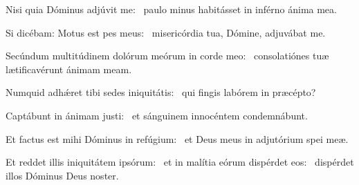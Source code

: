 \item Nisi quia Dóminus adjúvit me:~\psstar{} paulo minus habitásset in inférno ánima mea.

\item Si dicébam: Motus est pes meus:~\psstar{} misericórdia tua, Dómine, adjuvábat me.

\item Secúndum multitúdinem dolórum meórum in corde meo:~\psstar{} consolatiónes tuæ lætificavérunt ánimam meam.

\item Numquid adhǽret tibi sedes iniquitátis:~\psstar{} qui fingis labórem in præcépto?

\item Captábunt in ánimam justi:~\psstar{} et sánguinem innocéntem condemnábunt.

\item Et factus est mihi Dóminus in refúgium:~\psstar{} et Deus meus in adjutórium spei meæ.

\item Et reddet illis iniquitátem ipsórum:~\pscross{} et in malítia eórum dispérdet eos:~\psstar{} dispérdet illos Dóminus Deus noster.

